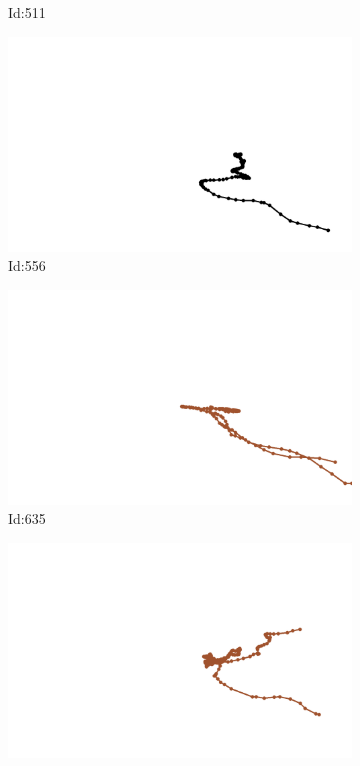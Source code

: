 \documentclass[12pt,twoside]{report}
\begin{document}
\begin{figure}
\begin{subfigure}[b]{0.20\textwidth}
\caption{Id:511}
\end{subfigure}
\begin{subfigure}[b]{0.20\textwidth}
\centering
\includegraphics[width=\textwidth]{../../trajectories/556.png}
\caption{Id:556}
\end{subfigure}
\begin{subfigure}[b]{0.20\textwidth}
\centering
\includegraphics[width=\textwidth]{../../trajectories/635.png}
\caption{Id:635}
\end{subfigure}
\begin{subfigure}[b]{0.20\textwidth}
\centering
\includegraphics[width=\textwidth]{../../trajectories/894.png}

\end{subfigure}
\end{figure}
\end{document}

